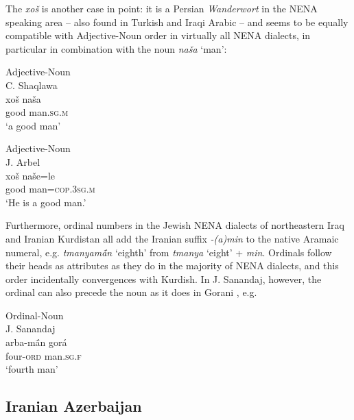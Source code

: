 \documentclass[output=paper,colorlinks,citecolor=brown,draftmode]{langscibook}
\begin{document}
The  \textit{xoš} is another case in point: it is a Persian \textit{Wanderwort} in the NENA speaking area -- also found in Turkish and Iraqi Arabic -- and seems to be equally compatible with Adjective-Noun order in virtually all NENA dialects, in particular in combination with the noun \textit{naša} `man':

\ea\label{NAINEI:ex:43}
Adjective-Noun\\
C. Shaqlawa \citep[Text 17:§12]{Khanetal2022FolkloreII} \\
\gll xoš naša \\
     good man\textsc{.sg.m} \\
\glt `a good man'
\z

\ea\label{NAINEI:ex:44}
Adjective-Noun\\
J. Arbel \citep[462.§326]{Khan1999JArbel} \\
\gll xoš naše=le \\
     good man\textsc{=cop.3sg.m} \\
\glt `He is a good man.'
\z

Furthermore, ordinal numbers in the Jewish NENA dialects of northeastern Iraq and Iranian Kurdistan all add the Iranian suffix \textit{-(a)min} to the native Aramaic numeral, e.g. \textit{tmanyamā́n} `eighth' from \textit{tmanya} `eight' + \textit{min}. Ordinals follow their heads as attributes as they do in the majority of NENA dialects, and this order incidentally convergences with Kurdish. In J. Sanandaj, however, the ordinal can also precede the noun as it does in Gorani \parencite[24]{MacKenzie1966}, e.g.

\ea\label{NAINEI:ex:45}
Ordinal-Noun\\
J. Sanandaj \citep[213]{Khan2009JSana} \\
\gll arba-mā́n gorá \\
     four\textsc{-ord} man\textsc{.sg.f} \\
\glt `fourth man'
\z

\subsection{Iranian Azerbaijan}\label{NAINEI:sec:3.2}
\end{document}
